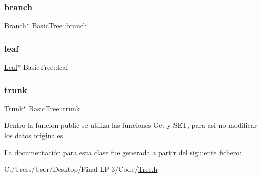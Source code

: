 \subsubsection{\texorpdfstring{branch}{branch}}
{\footnotesize\ttfamily \mbox{\hyperlink{class_branch}{Branch}}$\ast$ Basic\+Tree\+::branch}

\mbox{\label{class_basic_tree_a396fcfd963f9f5f845a2ca661ce020f7}} 
\subsubsection{\texorpdfstring{leaf}{leaf}}
{\footnotesize\ttfamily \mbox{\hyperlink{class_leaf}{Leaf}}$\ast$ Basic\+Tree\+::leaf}

\mbox{\label{class_basic_tree_ace2c7d40cde2b75633b634bfee0818d5}} 
\subsubsection{\texorpdfstring{trunk}{trunk}}
{\footnotesize\ttfamily \mbox{\hyperlink{class_trunk}{Trunk}}$\ast$ Basic\+Tree\+::trunk}

Dentro la funcion public se utiliza las funciones Get y S\+ET, para asi no modificar los datos originales. 

La documentación para esta clase fue generada a partir del siguiente fichero\+:\begin{DoxyCompactItemize}
\item 
C\+:/\+Users/\+User/\+Desktop/\+Final L\+P-\/3/\+Code/\mbox{\hyperlink{_tree_8h}{Tree.\+h}}\end{DoxyCompactItemize}
